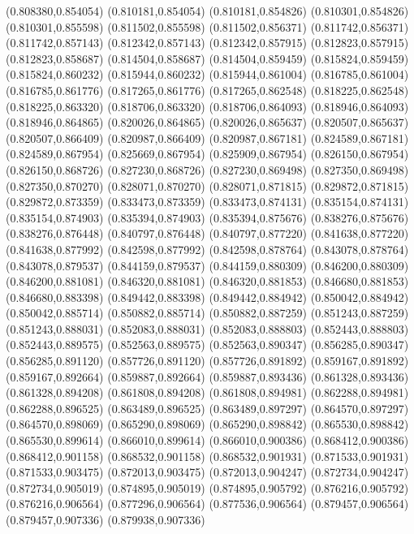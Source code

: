 (0.808380,0.854054)
(0.810181,0.854054)
(0.810181,0.854826)
(0.810301,0.854826)
(0.810301,0.855598)
(0.811502,0.855598)
(0.811502,0.856371)
(0.811742,0.856371)
(0.811742,0.857143)
(0.812342,0.857143)
(0.812342,0.857915)
(0.812823,0.857915)
(0.812823,0.858687)
(0.814504,0.858687)
(0.814504,0.859459)
(0.815824,0.859459)
(0.815824,0.860232)
(0.815944,0.860232)
(0.815944,0.861004)
(0.816785,0.861004)
(0.816785,0.861776)
(0.817265,0.861776)
(0.817265,0.862548)
(0.818225,0.862548)
(0.818225,0.863320)
(0.818706,0.863320)
(0.818706,0.864093)
(0.818946,0.864093)
(0.818946,0.864865)
(0.820026,0.864865)
(0.820026,0.865637)
(0.820507,0.865637)
(0.820507,0.866409)
(0.820987,0.866409)
(0.820987,0.867181)
(0.824589,0.867181)
(0.824589,0.867954)
(0.825669,0.867954)
(0.825909,0.867954)
(0.826150,0.867954)
(0.826150,0.868726)
(0.827230,0.868726)
(0.827230,0.869498)
(0.827350,0.869498)
(0.827350,0.870270)
(0.828071,0.870270)
(0.828071,0.871815)
(0.829872,0.871815)
(0.829872,0.873359)
(0.833473,0.873359)
(0.833473,0.874131)
(0.835154,0.874131)
(0.835154,0.874903)
(0.835394,0.874903)
(0.835394,0.875676)
(0.838276,0.875676)
(0.838276,0.876448)
(0.840797,0.876448)
(0.840797,0.877220)
(0.841638,0.877220)
(0.841638,0.877992)
(0.842598,0.877992)
(0.842598,0.878764)
(0.843078,0.878764)
(0.843078,0.879537)
(0.844159,0.879537)
(0.844159,0.880309)
(0.846200,0.880309)
(0.846200,0.881081)
(0.846320,0.881081)
(0.846320,0.881853)
(0.846680,0.881853)
(0.846680,0.883398)
(0.849442,0.883398)
(0.849442,0.884942)
(0.850042,0.884942)
(0.850042,0.885714)
(0.850882,0.885714)
(0.850882,0.887259)
(0.851243,0.887259)
(0.851243,0.888031)
(0.852083,0.888031)
(0.852083,0.888803)
(0.852443,0.888803)
(0.852443,0.889575)
(0.852563,0.889575)
(0.852563,0.890347)
(0.856285,0.890347)
(0.856285,0.891120)
(0.857726,0.891120)
(0.857726,0.891892)
(0.859167,0.891892)
(0.859167,0.892664)
(0.859887,0.892664)
(0.859887,0.893436)
(0.861328,0.893436)
(0.861328,0.894208)
(0.861808,0.894208)
(0.861808,0.894981)
(0.862288,0.894981)
(0.862288,0.896525)
(0.863489,0.896525)
(0.863489,0.897297)
(0.864570,0.897297)
(0.864570,0.898069)
(0.865290,0.898069)
(0.865290,0.898842)
(0.865530,0.898842)
(0.865530,0.899614)
(0.866010,0.899614)
(0.866010,0.900386)
(0.868412,0.900386)
(0.868412,0.901158)
(0.868532,0.901158)
(0.868532,0.901931)
(0.871533,0.901931)
(0.871533,0.903475)
(0.872013,0.903475)
(0.872013,0.904247)
(0.872734,0.904247)
(0.872734,0.905019)
(0.874895,0.905019)
(0.874895,0.905792)
(0.876216,0.905792)
(0.876216,0.906564)
(0.877296,0.906564)
(0.877536,0.906564)
(0.879457,0.906564)
(0.879457,0.907336)
(0.879938,0.907336)
